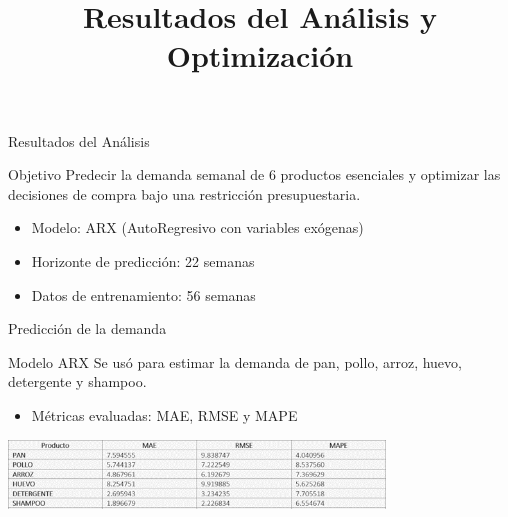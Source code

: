 \documentclass{beamer}
\title{Resultados del An\'alisis y Optimizaci\'on}
\author{}
\date{}
\begin{document}
\frame{\titlepage}

\begin{frame}{Resultados del An\'alisis}
\begin{block}{Objetivo}
Predecir la demanda semanal de 6 productos esenciales y optimizar las decisiones de compra bajo una restricci\'on presupuestaria.
\end{block}
\begin{itemize}
    \item Modelo: ARX (AutoRegresivo con variables ex\'ogenas)
    \item Horizonte de predicci\'on: 22 semanas
    \item Datos de entrenamiento: 56 semanas
\end{itemize}
\end{frame}

\begin{frame}{ Predicci\'on de la demanda}
\begin{block}{Modelo ARX}
Se us\'o para estimar la demanda de pan, pollo, arroz, huevo, detergente y shampoo.
\end{block}
\begin{itemize}
    \item M\'etricas evaluadas: MAE, RMSE y MAPE
\end{itemize}
\vspace{0.3cm}
\includegraphics[width=0.75\textwidth]{error.png}
\end{frame}
\end{document}
